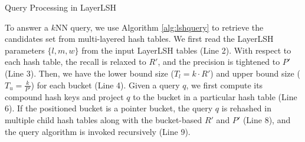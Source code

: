 \begin{algorithm}[t]
\SetNoFillComment
\SetAlgoNoLine
{}
\BlankLine

\BlankLine
{}
\caption{Query Processing in LayerLSH}
\label{alg:lshquery}
\end{algorithm}

To answer a $k$NN query, we use Algorithm \ref{alg:lshquery} to retrieve the candidates set from multi-layered hash tables. We first read the LayerLSH parameters $\{l,m,w\}$ from the input LayerLSH tables (Line 2). With respect to each hash table, the recall is relaxed to $R'$, and the precision is tightened to $P'$ (Line 3). Then, we have the lower bound size ($T_l=k\cdot R'$) and upper bound size ($T_u=\frac{k}{P'}$) for each bucket (Line 4). Given a query $q$, we first compute its compound hash keys and project $q$ to the bucket in a particular hash table (Line 6). If the positioned bucket is a pointer bucket, the query $q$ is rehashed in multiple child hash tables along with the bucket-based $R'$ and $P'$ (Line 8), and the query algorithm is invoked recursively (Line 9).


